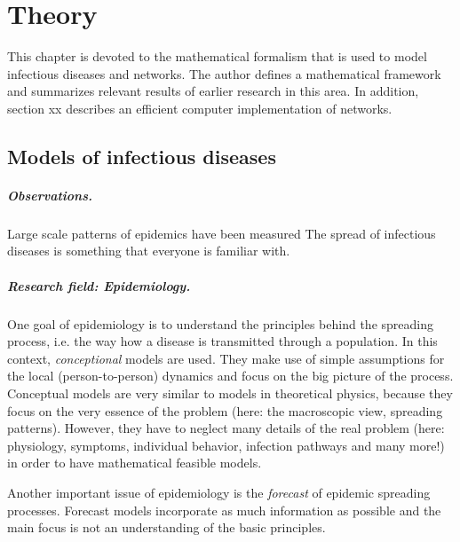 \documentclass[openright,twoside,headsepline]{scrbook}
\begin{document}
\graphicspath{{/Users/lentz/Documents/GitHub_locals/Thesis/images/}}



\chapter{Theory}
This chapter is devoted to the mathematical formalism that is used to model infectious diseases and networks.
The author defines a mathematical framework and summarizes relevant results of earlier research in this area.
In addition, section xx describes an efficient computer implementation of networks.

\section{Models of infectious diseases}
\paragraph{Observations.} Large scale patterns of epidemics have been measured \cite{geissel_der_menschheit}
The spread of infectious diseases is something that everyone is familiar with.

\paragraph{Research field: Epidemiology.} One goal of epidemiology is to understand the principles behind the spreading process, i.e. the way how a disease is transmitted through a population.
In this context, \emph{conceptional} models are used.
They make use of simple assumptions for the local (person-to-person) dynamics and focus on the big picture of the process.
Conceptual models are very similar to models in theoretical physics, because they focus on the very essence of the problem (here: the macroscopic view, spreading patterns).
However, they have to neglect many details of the real problem (here: physiology, symptoms, individual behavior, infection pathways and many more!) in order to have mathematical feasible models.

Another important issue of epidemiology is the \emph{forecast} of epidemic spreading processes.
Forecast models incorporate as much information as possible and the main focus is not an understanding of the basic principles.
\end{document}

